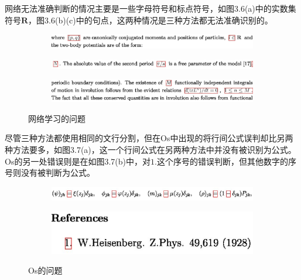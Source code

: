 网络无法准确判断的情况主要是一些字母符号和标点符号，如图3.6(a)中的实数集符号$\mathbf{R}$，图3.6(b)(c)中的句点，这两种情况是三种方法都无法准确识别的。

\begin{figure}[hp]
    \centering
    \begin{subfigure}[b]{\linewidth}
    \centering
    \includegraphics[scale=0.3]{eps/a21.eps}
    \caption{\label{fig:fig1}}
    \end{subfigure}

    \begin{subfigure}[b]{\linewidth}
    \centering
    \includegraphics[scale=0.3]{eps/a22.eps}
    \caption{\label{fig:fig2}}
    \end{subfigure}

    \begin{subfigure}[b]{\linewidth}
    \centering
    \includegraphics[scale=0.3]{eps/a23.eps}
    \caption{\label{fig:fig2}}
    \end{subfigure}

    \caption{网络学习的问题}
    \label{fig:label}
\end{figure}


尽管三种方法都使用相同的文行分割，但在Os中出现的将行间公式误判却比另两种方法要多，如图3.7(a)，这一个行间公式在另两种方法中并没有被识别为公式。Os的另一处错误则是在如图3.7(b)中，对$1.$这个序号的错误判断，但其他数字的序号则没有被判断为公式。

\begin{figure}[hp]
    \centering

    \begin{subfigure}[b]{\linewidth}
    \centering
    \includegraphics[scale=0.3]{eps/os1.eps}
    \caption{\label{fig:fig1}}
    \end{subfigure}

    \begin{subfigure}[b]{\linewidth}
    \centering
    \includegraphics[scale=0.3]{eps/os2.eps}
    \caption{\label{fig:fig2}}
    \end{subfigure}

    \caption{Os的问题}
    \label{fig:label}
\end{figure}

